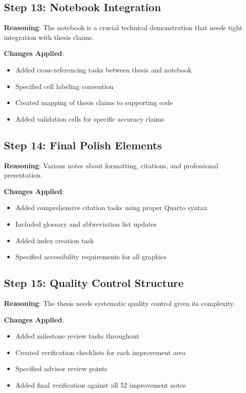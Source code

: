 \documentclass[
  11pt,
  letterpaper,
]{book}
\providecommand{\tightlist}{%
  \setlength{\itemsep}{0pt}\setlength{\parskip}{0pt}}
\begin{document}
\subsection{Step 13: Notebook
Integration}\label{step-13-notebook-integration}

\textbf{Reasoning}: The notebook is a crucial technical demonstration
that needs tight integration with thesis claims.

\textbf{Changes Applied}:

\begin{itemize}
\tightlist
\item
  Added cross-referencing tasks between thesis and notebook
\item
  Specified cell labeling convention
\item
  Created mapping of thesis claims to supporting code
\item
  Added validation cells for specific accuracy claims
\end{itemize}

\subsection{Step 14: Final Polish
Elements}\label{step-14-final-polish-elements}

\textbf{Reasoning}: Various notes about formatting, citations, and
professional presentation.

\textbf{Changes Applied}:

\begin{itemize}
\tightlist
\item
  Added comprehensive citation tasks using proper Quarto syntax
\item
  Included glossary and abbreviation list updates
\item
  Added index creation task
\item
  Specified accessibility requirements for all graphics
\end{itemize}

\subsection{Step 15: Quality Control
Structure}\label{step-15-quality-control-structure}

\textbf{Reasoning}: The thesis needs systematic quality control given
its complexity.

\textbf{Changes Applied}:

\begin{itemize}
\tightlist
\item
  Added milestone review tasks throughout
\item
  Created verification checklists for each improvement area
\item
  Specified advisor review points
\item
  Added final verification against all 52 improvement notes
\end{itemize}
\end{document}
